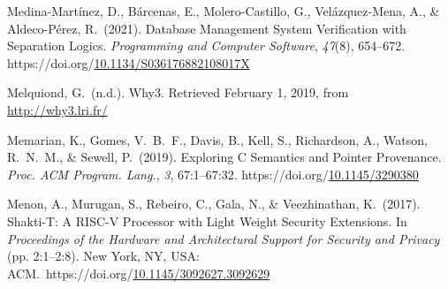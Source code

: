 \documentclass[12pt,twoside]{article}
\begin{document}
{\begin{thebibliography}{1079}
\mdbibitemlabel{}Medina-Martínez, D., Bárcenas, E., Molero-Castillo, G., Velázquez-Mena, A., \& Aldeco-Pérez, R.~(2021). Database Management System Verification with Separation Logics. \emph{Programming and Computer Software}, \emph{47}(8), 654–672. https://doi.org/\href{https://dx.doi.org/10.1134/S036176882108017X}{10.1134/S036176882108017X}%

\mdbibitemlabel{}Melquiond, G.~(n.d.). Why3. Retrieved February 1, 2019, from \href{http://why3.lri.fr/}{{\ttfamily http://\hspace{0pt}why3.\hspace{0pt}lri.\hspace{0pt}fr/\hspace{0pt}}}%

\mdbibitemlabel{}Memarian, K., Gomes, V.~B.~F., Davis, B., Kell, S., Richardson, A., Watson, R.~N.~M., \& Sewell, P.~(2019). Exploring C Semantics and Pointer Provenance. \emph{Proc. ACM Program. Lang.}, \emph{3}, 67:1–67:32. https://doi.org/\href{https://dx.doi.org/10.1145/3290380}{10.1145/3290380}%

\mdbibitemlabel{}Menon, A., Murugan, S., Rebeiro, C., Gala, N., \& Veezhinathan, K.~(2017). Shakti-T: A RISC-V Processor with Light Weight Security Extensions. In \emph{Proceedings of the Hardware and Architectural Support for Security and Privacy} (pp. 2:1–2:8). New York, NY, USA: ACM.~https://doi.org/\href{https://dx.doi.org/10.1145/3092627.3092629}{10.1145/3092627.3092629}%


\end{thebibliography}}
\end{document}
